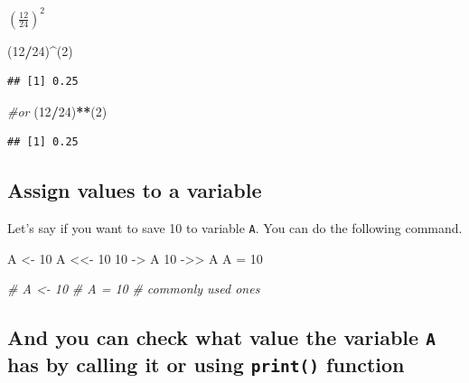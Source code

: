 \documentclass[
]{article}
\newenvironment{Shaded}{\begin{snugshade}}{\end{snugshade}}
\newcommand{\CommentTok}[1]{\textcolor[rgb]{0.56,0.35,0.01}{\textit{#1}}}
\newcommand{\DecValTok}[1]{\textcolor[rgb]{0.00,0.00,0.81}{#1}}
\newcommand{\NormalTok}[1]{#1}
\newcommand{\OtherTok}[1]{\textcolor[rgb]{0.56,0.35,0.01}{#1}}
\newcommand{\SpecialCharTok}[1]{\textcolor[rgb]{0.81,0.36,0.00}{\textbf{#1}}}
\begin{document}
\((\frac{12}{24})^2\)

\begin{Shaded}
\begin{Highlighting}[]
\NormalTok{(}\DecValTok{12}\SpecialCharTok{/}\DecValTok{24}\NormalTok{)}\SpecialCharTok{\^{}}\NormalTok{(}\DecValTok{2}\NormalTok{)}
\end{Highlighting}
\end{Shaded}

\begin{verbatim}
## [1] 0.25
\end{verbatim}

\begin{Shaded}
\begin{Highlighting}[]
\CommentTok{\#or}
\NormalTok{(}\DecValTok{12}\SpecialCharTok{/}\DecValTok{24}\NormalTok{)}\SpecialCharTok{**}\NormalTok{(}\DecValTok{2}\NormalTok{)}
\end{Highlighting}
\end{Shaded}

\begin{verbatim}
## [1] 0.25
\end{verbatim}

\subsection{Assign values to a
variable}\label{assign-values-to-a-variable}

Let's say if you want to save 10 to variable \texttt{A}. You can do the
following command.

\begin{Shaded}
\begin{Highlighting}[]
\NormalTok{A }\OtherTok{\textless{}{-}} \DecValTok{10}
\NormalTok{A }\OtherTok{\textless{}\textless{}{-}} \DecValTok{10}
\DecValTok{10} \OtherTok{{-}\textgreater{}}\NormalTok{ A}
\DecValTok{10} \OtherTok{{-}\textgreater{}\textgreater{}}\NormalTok{ A}
\NormalTok{A }\OtherTok{=} \DecValTok{10}

\CommentTok{\# A \textless{}{-} 10}
\CommentTok{\# A = 10 }
\CommentTok{\# commonly used ones }
\end{Highlighting}
\end{Shaded}

\subsection{\texorpdfstring{And you can check what value the variable
\texttt{A} has by calling it or using \texttt{print()}
function}{And you can check what value the variable A has by calling it or using print() function}}\label{and-you-can-check-what-value-the-variable-a-has-by-calling-it-or-using-print-function}
\end{document}
